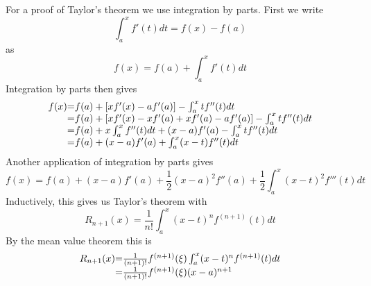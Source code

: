 For a proof of Taylor's theorem we use integration by parts. First we
write
\[ \int_a^xf'(t)dt=f(x)-f(a) \]
as
\[ f(x) = f(a)+\int_a^xf'(t)dt \]
Integration by parts then gives
\[
\begin{array}{r@{=}l}
  f(x)
    &f(a)+[xf'(x)-af'(a)]-\int_a^xtf''(t)dt\\
    &f(a)+[xf'(x)-xf'(a)+xf'(a)-af'(a)]-\int_a^xtf''(t)dt\\
    &f(a)+x\int_a^xf''(t)dt+(x-a)f'(a)-\int_a^xtf''(t)dt\\
    &f(a)+(x-a)f'(a)+\int_a^x(x-t)f''(t)dt\\
\end{array}
\]
Another application of integration by parts gives
\[ f(x)=f(a)+(x-a)f'(a)+\frac12(x-a)^2f''(a)
    +\frac12 \int_a^x(x-t)^2f'''(t)dt
\]
Inductively, this gives us Taylor's theorem with
\[ R_{n+1}(x) = \frac1{n!}\int_a^x(x-t)^nf^{(n+1)}(t)dt \]
By the mean value theorem this is
\[
\begin{array}{r@{=}l}
R_{n+1}(x)
&\frac1{(n+1)!}f^{(n+1)}(\xi)\int_a^x(x-t)^nf^{(n+1)}(t)dt\\
&\frac1{(n+1)!}f^{(n+1)}(\xi)(x-a)^{n+1}
\end{array}
\]

